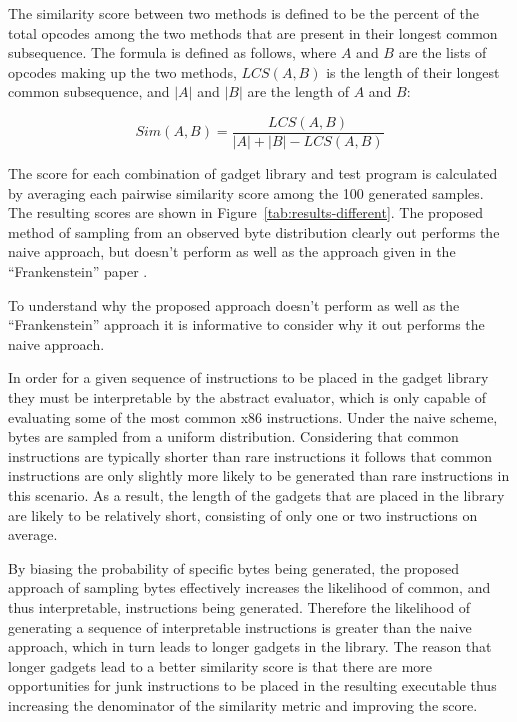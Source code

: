     The similarity score between two methods is defined to be the percent of the
    total opcodes among the two methods that are present in their longest common
    subsequence. The formula is defined as follows, where $A$ and $B$ are the
    lists of opcodes making up the two methods, $LCS(A,B)$ is the length of
    their longest common subsequence, and $|A|$ and $|B|$ are the length of $A$
    and $B$:

    $$Sim(A,B) = \frac{LCS(A,B)}{|A| + |B| - LCS(A,B)}$$

    The score for each combination of gadget library and test program is
    calculated by averaging each pairwise similarity score among the 100
    generated samples. The resulting scores are shown in
    Figure~\ref{tab:results-different}. The proposed method of sampling from an
    observed byte distribution clearly out performs the naive approach, but
    doesn't perform as well as the approach given in the ``Frankenstein''
    paper \cite{franken}.

    To understand why the proposed approach doesn't perform as well as the
    ``Frankenstein'' approach it is informative to consider why it out performs
    the naive approach.
    
    In order for a given sequence of instructions to be placed in the gadget
    library they must be interpretable by the abstract evaluator, which is only
    capable of evaluating some of the most common x86 instructions. Under the
    naive scheme, bytes are sampled from a uniform distribution. Considering
    that common instructions are typically shorter than rare instructions it
    follows that common instructions are only slightly more likely to be
    generated than rare instructions in this scenario. As a result, the length
    of the gadgets that are placed in the library are likely to be relatively
    short, consisting of only one or two instructions on average.

    By biasing the probability of specific bytes being generated, the proposed
    approach of sampling bytes effectively increases the likelihood of common,
    and thus interpretable, instructions being generated. Therefore the
    likelihood of generating a sequence of interpretable instructions is greater
    than the naive approach, which in turn leads to longer gadgets in the
    library. The reason that longer gadgets lead to a better similarity score is
    that there are more opportunities for junk instructions to be placed in the
    resulting executable thus increasing the denominator of the similarity
    metric and improving the score.
    
